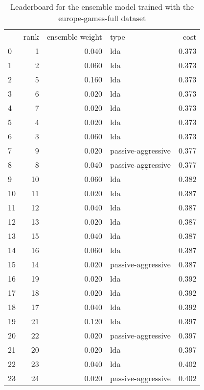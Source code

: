 \begin{table}[]
	\centering
	\begin{tabular}{lrrlr}
		   & rank & ensemble-weight & type               & cost  \\
		0  & 1    & 0.040           & lda                & 0.373 \\
		1  & 2    & 0.060           & lda                & 0.373 \\
		2  & 5    & 0.160           & lda                & 0.373 \\
		3  & 6    & 0.020           & lda                & 0.373 \\
		4  & 7    & 0.020           & lda                & 0.373 \\
		5  & 4    & 0.020           & lda                & 0.373 \\
		6  & 3    & 0.060           & lda                & 0.373 \\
		7  & 9    & 0.020           & passive-aggressive & 0.377 \\
		8  & 8    & 0.040           & passive-aggressive & 0.377 \\
		9  & 10   & 0.060           & lda                & 0.382 \\
		10 & 11   & 0.020           & lda                & 0.387 \\
		11 & 12   & 0.040           & lda                & 0.387 \\
		12 & 13   & 0.020           & lda                & 0.387 \\
		13 & 15   & 0.040           & lda                & 0.387 \\
		14 & 16   & 0.060           & lda                & 0.387 \\
		15 & 14   & 0.020           & passive-aggressive & 0.387 \\
		16 & 19   & 0.020           & lda                & 0.392 \\
		17 & 18   & 0.020           & lda                & 0.392 \\
		18 & 17   & 0.040           & lda                & 0.392 \\
		19 & 21   & 0.120           & lda                & 0.397 \\
		20 & 22   & 0.020           & passive-aggressive & 0.397 \\
		21 & 20   & 0.020           & lda                & 0.397 \\
		22 & 23   & 0.040           & lda                & 0.402 \\
		23 & 24   & 0.020           & passive-aggressive & 0.402 \\
	\end{tabular}

	\caption{Leaderboard for the ensemble model trained with the europe-games-full dataset}
	\label{tab:lb-europe-games-full-PCA}
\end{table}

